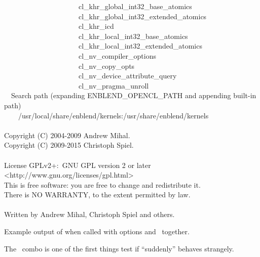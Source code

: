 \begin{exemplar}[htbp]
\begin{maxipage}
\begin{terminal}
        ~~~~~~~~~~~~~~~~~~~~~cl\_khr\_global\_int32\_base\_atomics \\
        ~~~~~~~~~~~~~~~~~~~~~cl\_khr\_global\_int32\_extended\_atomics \\
        ~~~~~~~~~~~~~~~~~~~~~cl\_khr\_icd \\
        ~~~~~~~~~~~~~~~~~~~~~cl\_khr\_local\_int32\_base\_atomics \\
        ~~~~~~~~~~~~~~~~~~~~~cl\_khr\_local\_int32\_extended\_atomics \\
        ~~~~~~~~~~~~~~~~~~~~~cl\_nv\_compiler\_options \\
        ~~~~~~~~~~~~~~~~~~~~~cl\_nv\_copy\_opts \\
        ~~~~~~~~~~~~~~~~~~~~~cl\_nv\_device\_attribute\_query \\
        ~~~~~~~~~~~~~~~~~~~~~cl\_nv\_pragma\_unroll \\
        ~~Search path (expanding ENBLEND\_OPENCL\_PATH and appending built-in path) \\
        ~~~~/usr/local/share/enblend/kernels:/usr/share/enblend/kernels \\
        ~ \\
        Copyright (C) 2004-2009 Andrew Mihal. \\
        Copyright (C) 2009-2015 Christoph Spiel. \\
        ~ \\
        License GPLv2+:~GNU GPL version 2 or later <http://www.gnu.org/licenses/gpl.html> \\
        This is free software: you are free to change and redistribute it. \\
        There is NO WARRANTY, to the extent permitted by law. \\
        ~ \\
        Written by Andrew Mihal, Christoph Spiel and others.
    \end{terminal}
  \end{maxipage}

  \caption[Output of ]{\label{ex:option-version-verbose}Example output of \appcmd{} when called with
    options  and~ together.}
\end{exemplar}

The ~combo is one of the first things test if \appcmd{} ``suddenly''
behaves strangely.

